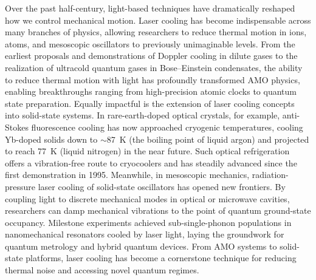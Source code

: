 Over the past half-century, light-based techniques have dramatically reshaped how we control mechanical motion. Laser cooling has become indispensable across many branches of physics, allowing researchers to reduce thermal motion in ions, atoms, and mesoscopic oscillators to previously unimaginable levels. From the earliest proposals and demonstrations of Doppler cooling in dilute gases \cite{hansch1975cooling} to the realization of ultracold quantum gases in Bose–Einstein condensates, \cite{anderson1995observation} the ability to reduce thermal motion with light has profoundly transformed \ac{AMO} physics, enabling breakthroughs ranging from high-precision atomic clocks to quantum state preparation. \cite{ludlow2015optical} Equally impactful is the extension of laser cooling concepts into solid-state systems. In rare-earth-doped optical crystals, for example, anti-Stokes fluorescence cooling has now approached cryogenic temperatures, cooling Yb-doped solids down to \(\sim\)\SI{87}{\kelvin} (the boiling point of liquid argon) and projected to reach \SI{77}{\kelvin} (liquid nitrogen) in the near future. \cite{meng2018realization} Such optical refrigeration offers a vibration-free route to cryocoolers and has steadily advanced since the first demonstration in 1995. \cite{epstein1995observation} Meanwhile, in mesoscopic mechanics, radiation-pressure laser cooling of solid-state oscillators has opened new frontiers. By coupling light to discrete mechanical modes in optical or microwave cavities, researchers can damp mechanical vibrations to the point of quantum ground-state occupancy. \cite{chan2011laser} Milestone experiments achieved sub-single-phonon populations in nanomechanical resonators cooled by laser light\cite{chan2011laser}, laying the groundwork for quantum metrology and hybrid quantum devices. From \ac{AMO} systems to solid-state platforms, laser cooling has become a cornerstone technique for reducing thermal noise and accessing novel quantum regimes.


